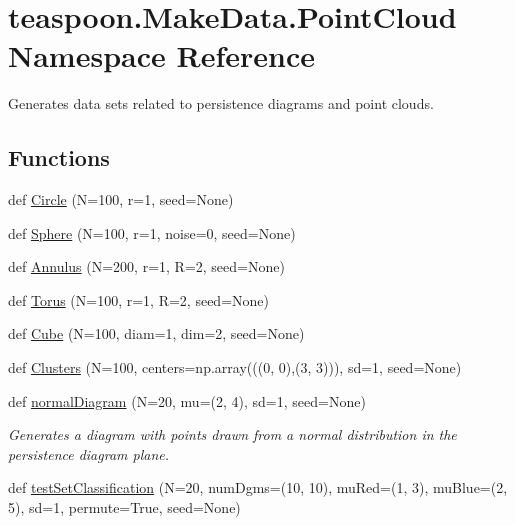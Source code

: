 \hypertarget{namespaceteaspoon_1_1_make_data_1_1_point_cloud}{}\section{teaspoon.\+Make\+Data.\+Point\+Cloud Namespace Reference}
\label{namespaceteaspoon_1_1_make_data_1_1_point_cloud}


Generates data sets related to persistence diagrams and point clouds.  


\subsection*{Functions}
\begin{DoxyCompactItemize}
\item 
def \hyperlink{namespaceteaspoon_1_1_make_data_1_1_point_cloud_a89af9aed6706a0a5ee9a2cbeec801db2}{Circle} (N=100, r=1, seed=None)
\item 
def \hyperlink{namespaceteaspoon_1_1_make_data_1_1_point_cloud_af130e51668240f775bca4ff195be2bea}{Sphere} (N=100, r=1, noise=0, seed=None)
\item 
def \hyperlink{namespaceteaspoon_1_1_make_data_1_1_point_cloud_a3720c7f39eecd56c7e4375cc0feef4ed}{Annulus} (N=200, r=1, R=2, seed=None)
\item 
def \hyperlink{namespaceteaspoon_1_1_make_data_1_1_point_cloud_a85b2e43a1f8feda494c13d9c8537c0a2}{Torus} (N=100, r=1, R=2, seed=None)
\item 
def \hyperlink{namespaceteaspoon_1_1_make_data_1_1_point_cloud_ad2738d11d9b3018aab5d163587239518}{Cube} (N=100, diam=1, dim=2, seed=None)
\item 
def \hyperlink{namespaceteaspoon_1_1_make_data_1_1_point_cloud_a130af3abbe5cb02a99c3f64d3f3dd979}{Clusters} (N=100, centers=np.\+array(((0, 0),(3, 3))), sd=1, seed=None)
\item 
def \hyperlink{namespaceteaspoon_1_1_make_data_1_1_point_cloud_afb6f087ced9440d9c2834a2a35e4344c}{normal\+Diagram} (N=20, mu=(2, 4), sd=1, seed=None)
\begin{DoxyCompactList}\small\item\em Generates a diagram with points drawn from a normal distribution in the persistence diagram plane. \end{DoxyCompactList}\item 
def \hyperlink{namespaceteaspoon_1_1_make_data_1_1_point_cloud_ad06993de8a3ffe4db7b73ca30c85da4e}{test\+Set\+Classification} (N=20, num\+Dgms=(10, 10), mu\+Red=(1, 3), mu\+Blue=(2, 5), sd=1, permute=True, seed=None)

\end{DoxyCompactItemize}
